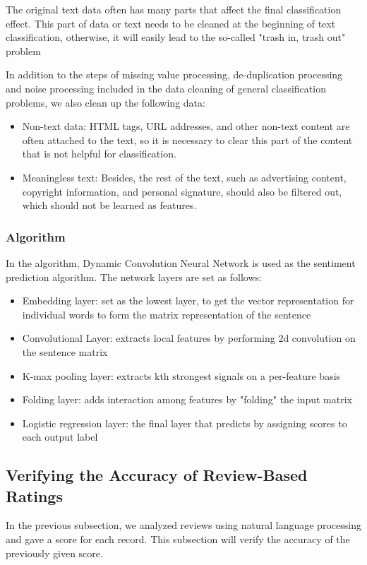 \documentclass{mcmthesis}
\begin{document}
	
	The original text data often has many parts that affect the final classification effect. This part of data or text needs to be cleaned at the beginning of text classification, otherwise, it will easily lead to the so-called "trash in, trash out" problem\cite{2}
	
	In addition to the steps of missing value processing, de-duplication processing and noise processing included in the data cleaning of general classification problems, we also clean up the following data:
	\begin{itemize}
		\item Non-text data: HTML tags, URL addresses, and other non-text content are often attached to the text, so it is necessary to clear this part of the content that is not helpful for classification.
		\item Meaningless text: Besides, the rest of the text, such as advertising content, copyright information, and personal signature, should also be filtered out, which should not be learned as features.
	\end{itemize}
	\subsubsection{Algorithm}
	In the algorithm, Dynamic Convolution Neural Network is used as the sentiment prediction algorithm. The network layers are set as follows:
	\begin{itemize}
		\item Embedding layer: set as the lowest layer, to get the vector representation for individual words to form the matrix representation of the sentence
		\item Convolutional Layer: extracts local features by performing 2d convolution on the sentence matrix
		\item K-max pooling layer: extracts kth strongest signals on a per-feature basis
		\item Folding layer: adds interaction among features by "folding" the input matrix
		\item Logistic regression layer: the final layer that predicts by assigning scores to each output label
	\end{itemize}
	
	
	\subsection{Verifying the Accuracy of Review-Based Ratings}
	In the previous subsection, we analyzed reviews using natural language processing and gave a score for each record. This subsection will verify the accuracy of the previously given score.
	
\end{document}
